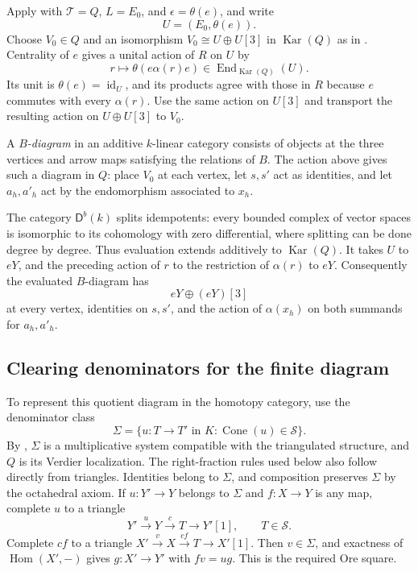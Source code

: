 \documentclass[11pt]{article}
\numberwithin{equation}{section}
\theoremstyle{definition}
\theoremstyle{remark}
\newcommand{\D}{\mathsf D}
\DeclareMathOperator{\Hom}{Hom}
\DeclareMathOperator{\End}{End}
\DeclareMathOperator{\id}{id}
\DeclareMathOperator{\Cone}{Cone}
\DeclareMathOperator{\Kar}{Kar}
\begin{document}
Apply  with $\mathcal T=Q$, $L=E_0$, and
$\epsilon=\theta(e)$, and write
\[
  U=(E_0,\theta(e)).
\]
Choose $V_0\in Q$ and an isomorphism $V_0\cong U\oplus U[3]$
in $\Kar(Q)$ as in .
Centrality of $e$ gives a unital action of $R$ on $U$ by
\[
  r\longmapsto\theta(e\alpha(r)e)\in\End_{\Kar(Q)}(U).
\]
Its unit is $\theta(e)=\id_U$, and its products agree with those
in $R$ because $e$ commutes with every $\alpha(r)$.
Use the same action on $U[3]$ and transport the resulting action
on $U\oplus U[3]$ to $V_0$.

A \emph{$B$-diagram} in an additive $k$-linear category consists of
objects at the three vertices and arrow maps satisfying the relations
of $B$. The action above gives such a diagram in $Q$: place $V_0$ at
each vertex, let $s,s'$ act as identities, and let $a_h,a'_h$ act
by the endomorphism associated to $x_h$.

The category $\D^b(k)$ splits idempotents: every bounded complex of
vector spaces is isomorphic to its cohomology with zero differential,
where splitting can be done degree by degree.  Thus evaluation extends
additively to $\Kar(Q)$.  It takes $U$ to $eY$, and the preceding
action of $r$ to the restriction of $\alpha(r)$ to $eY$.
Consequently the evaluated $B$-diagram has
\begin{equation}\label{eq:target-evaluation}
  eY\oplus(eY)[3]
\end{equation}
at every vertex, identities on $s,s'$, and the action of
$\alpha(x_h)$ on both summands for $a_h,a'_h$.

\subsection{Clearing denominators for the finite diagram}

To represent this quotient diagram in the homotopy category, use
the denominator class
\[
  \Sigma=\{u:T\to T'\text{ in }K:\Cone(u)\in\mathcal S\}.
\]
By \cite[Tag 05RG]{StacksProject}, $\Sigma$ is a multiplicative
system compatible with the triangulated structure, and $Q$ is its
Verdier localization. The right-fraction rules used below also follow
directly from triangles.
Identities belong to $\Sigma$, and composition preserves $\Sigma$
by the octahedral axiom.  If $u:Y'\to Y$ belongs to $\Sigma$ and
$f:X\to Y$ is any map, complete $u$ to a triangle
\[
  Y'\xrightarrow{u}Y\xrightarrow{c}T\longrightarrow Y'[1],
  \qquad T\in\mathcal S.
\]
Complete $cf$ to a triangle
$X'\xrightarrow{v}X\xrightarrow{cf}T\to X'[1]$.
Then $v\in\Sigma$, and exactness of $\Hom(X',-)$ gives
$g:X'\to Y'$ with $fv=ug$.  This is the required Ore square.
\end{document}
